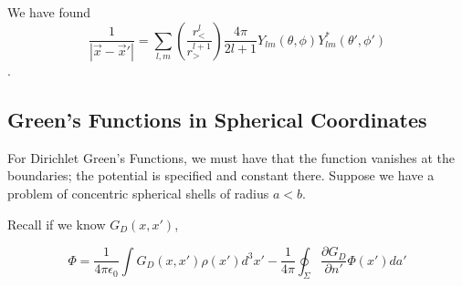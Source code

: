 \documentclass[a4paper,twoside,master.tex]{subfiles}
\begin{document}
\begin{ex}
We have found
\begin{equation}
    \frac{1}{|\vec{x}-\vec{x}'|} = \sum_{l,m}\left(\frac{r_<^l}{r_>^{l+1}}\right)\frac{4\pi}{2l+1}Y_{lm}(\theta,\phi)Y_{lm}^*(\theta',\phi')
\end{equation}.
\end{ex}

\subsection{Green's Functions in Spherical Coordinates}%
\label{sub:green_s_functions_in_spherical_coordinates}


For Dirichlet Green's Functions, we must have that the function vanishes at the boundaries; the potential is specified and constant there. Suppose we have a problem of concentric spherical shells of radius $a<b$.

Recall if we know $G_D(x,x')$,

\begin{equation}
    \Phi = \frac{1}{4\pi\epsilon_0}\int G_D(x,x')\rho(x')d^3x' - \frac{1}{4\pi}\oint_{\Sigma}\frac{\partial G_D}{\partial n'}\Phi(x')da'
\end{equation}
\end{document}
